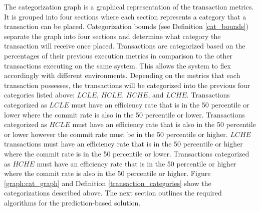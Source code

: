 \documentclass[conference]{IEEEtran}
\begin{document}
The categorization graph is a graphical representation of the transaction metrics. It is grouped into four sections where each section represents a category that a transaction can be placed. Categorization bounds (see Definition \ref{cat_bounds}) separate the graph into four sections and determine what category the transaction will receive once placed. Transactions are categorized based on the percentages of their previous execution metrics in comparison to the other transactions executing on the same system. This allows the system to flex accordingly with different environments. Depending on the metrics that each transaction possesses, the transactions will be categorized into the previous four categories listed above: $LCLE$, $HCLE$, $HCHE$, and $LCHE$. Transactions categorized as $LCLE$ must have an efficiency rate that is in the 50 percentile or lower where the commit rate is also in the 50 percentile or lower. Transactions categorized as $HCLE$ must have an efficiency rate that is also in the 50 percentile or lower however the commit rate must be in the 50 percentile or higher. $LCHE$ transactions must have an efficiency rate that is in the 50 percentile or higher where the commit rate is in the 50 percentile or lower. Transactions categorized as $HCHE$ must have an efficiency rate that is in the 50 percentile or higher where the commit rate is also in the 50 percentile or higher. Figure \ref{graph:cat_graph} and Definition \ref{transaction_categories} show the categorizations described above. The next section outlines the required algorithms for the prediction-based solution.

\end{document}
